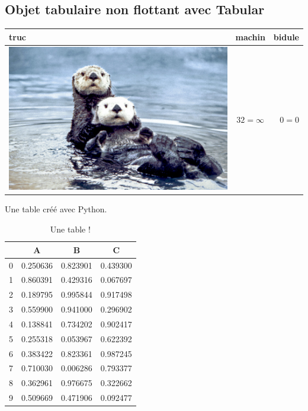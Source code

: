 \documentclass[a4paper, twoside, onecolumn, 10pt]{article}
\begin{document}
\subsection{Objet tabulaire non flottant avec Tabular}

\blindtext[2]

\begin{tabular}{l|cr}
\hline
truc & machin & bidule \\
\hline
\includegraphics[scale = .03]{images/loutre.jpg} & $32 = \infty$ & $0 =0$\\
\hline
\end{tabular}

Une table créé avec Python.

\begin{table}
\begin{center}
\begin{tabular}{lccc}
\toprule
{} &         \textbf{A} &         \textbf{B} &         \textbf{C} \\
\midrule
0 &  0.250636 &  0.823901 &  0.439300 \\
1 &  0.860391 &  0.429316 &  0.067697 \\
2 &  0.189795 &  0.995844 &  0.917498 \\
3 &  0.559900 &  0.941000 &  0.296902 \\
4 &  0.138841 &  0.734202 &  0.902417 \\
5 &  0.255318 &  0.053967 &  0.622392 \\
6 &  0.383422 &  0.823361 &  0.987245 \\
7 &  0.710030 &  0.006286 &  0.793377 \\
8 &  0.362961 &  0.976675 &  0.322662 \\
9 &  0.509669 &  0.471906 &  0.092477 \\
\bottomrule
\end{tabular}
\end{center}
\caption{Une table !}
\label{tab:une_table}
\end{table}
\end{document}

